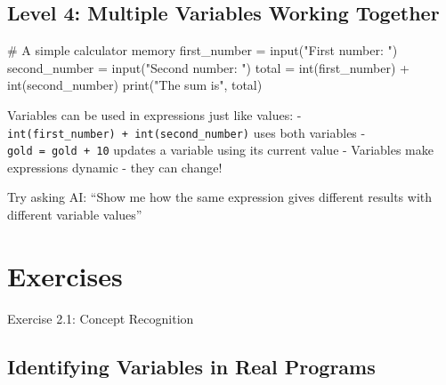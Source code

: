 \documentclass[
  letterpaper,
  DIV=11,
  numbers=noendperiod,
  oneside]{scrreprt}
\newenvironment{Shaded}{}{}
\newcommand{\BuiltInTok}[1]{\textcolor[rgb]{0.84,0.23,0.29}{#1}}
\newcommand{\CommentTok}[1]{\textcolor[rgb]{0.42,0.45,0.49}{#1}}
\newcommand{\NormalTok}[1]{\textcolor[rgb]{0.14,0.16,0.18}{#1}}
\newcommand{\OperatorTok}[1]{\textcolor[rgb]{0.14,0.16,0.18}{#1}}
\newcommand{\StringTok}[1]{\textcolor[rgb]{0.01,0.18,0.38}{#1}}
\begin{document}
\subsection{Level 4: Multiple Variables Working
Together}\label{level-4-multiple-variables-working-together}

\begin{Shaded}
\begin{Highlighting}[]
\CommentTok{\# A simple calculator memory}
\NormalTok{first\_number }\OperatorTok{=} \BuiltInTok{input}\NormalTok{(}\StringTok{"First number: "}\NormalTok{)}
\NormalTok{second\_number }\OperatorTok{=} \BuiltInTok{input}\NormalTok{(}\StringTok{"Second number: "}\NormalTok{)}
\NormalTok{total }\OperatorTok{=} \BuiltInTok{int}\NormalTok{(first\_number) }\OperatorTok{+} \BuiltInTok{int}\NormalTok{(second\_number)}
\BuiltInTok{print}\NormalTok{(}\StringTok{"The sum is"}\NormalTok{, total)}
\end{Highlighting}
\end{Shaded}

\begin{tcolorbox}[enhanced jigsaw, opacityback=0, colback=white, colframe=quarto-callout-note-color-frame, breakable, titlerule=0mm, coltitle=black, rightrule=.15mm, colbacktitle=quarto-callout-note-color!10!white, left=2mm, bottomtitle=1mm, bottomrule=.15mm, title=\textcolor{quarto-callout-note-color}{\faInfo}\hspace{0.5em}{Expression Explorer: Variables in Expressions}, opacitybacktitle=0.6, toptitle=1mm, leftrule=.75mm, arc=.35mm, toprule=.15mm]

Variables can be used in expressions just like values: -
\texttt{int(first\_number)\ +\ int(second\_number)} uses both variables
- \texttt{gold\ =\ gold\ +\ 10} updates a variable using its current
value - Variables make expressions dynamic - they can change!

Try asking AI: ``Show me how the same expression gives different results
with different variable values''

\end{tcolorbox}

\section{Exercises}\label{exercises-2}

Exercise 2.1: Concept Recognition

\subsection{Identifying Variables in Real
Programs}\label{identifying-variables-in-real-programs}
\end{document}

